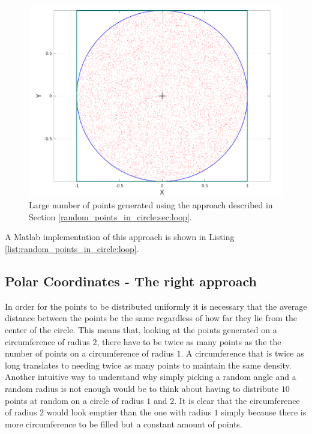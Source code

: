\begin{figure}
	\label{fig:random_points_in_cirle:loop}
	\centering
	\includegraphics[scale=0.3]{sources/random_points_in_circle/images/loop_points}
	\caption{Large number of points generated using the approach described in Section \ref{random_points_in_circle:sec:loop}.}
\end{figure}

A Matlab implementation of this approach is shown in Listing \ref{list:random_points_in_circle:loop}.



\subsection{Polar Coordinates - The right approach}
\label{random_points_in_circle:sec:polar_sqrt}


In order for the points to be distributed uniformly it is necessary that the average distance between the points be the same regardless of how far they lie from the center of the circle. This means that,  looking at the points generated on a circumference of radius $2$, there have to be twice as many points as the the number of points on a circumference of radius $1$. A circumference that is twice as long translates to needing twice as many points to maintain the same density. 
Another intuitive way to understand why simply picking a random angle and a random radius is not enough would be to think about having to distribute $10$ points at random on a circle of radius $1$ and $2$. It is clear that the circumference of radius $2$ would look emptier than the one with radius $1$ simply because there is more circumference to be filled but a constant amount of points. 

